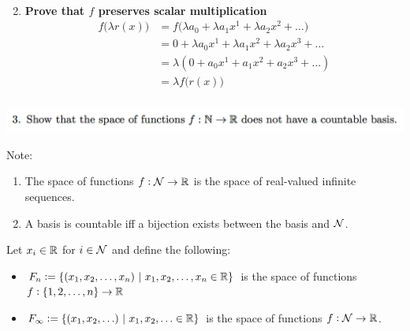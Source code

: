 \begin{enumerate}
  \begin{align*}
  \end{align*}

\item \textbf{Prove that $f$ preserves scalar multiplication}
  \begin{align*}
    f\Big(\lambda r(x)\Big)
    &= f\Big(\lambda a_0 + \lambda a_1x^1 + \lambda a_2x^2 + \ldots \Big) \\
    &= 0 + \lambda a_0x^1 + \lambda a_1x^2 + \lambda a_2x^3 + \ldots \\
    &= \lambda(0 + a_0x^1 + a_1x^2 + a_2x^3 + \ldots) \\
    &= \lambda f\Big(r(x)\Big)
  \end{align*}


\end{enumerate}

\newpage
\subsubsection{} %
\begin{mdframed}
  \includegraphics[width=400pt]{img/linear-algebra-a0-1-3.png}\\
\end{mdframed}

Note:
\begin{enumerate}
\item The space of functions $f:\mathcal{N} \to \mathbb{R}$ is the space of real-valued
  infinite sequences.
\item A basis is countable iff a bijection exists between the basis and $\mathcal{N}$.
\end{enumerate}


Let $x_i \in \mathbb{R}$ for
$i \in \mathcal{N}$ and define the following:
\begin{itemize}
\item $F_n := \{(x_1, x_2, \ldots, x_n) ~|~ x_1, x_2, \ldots, x_n \in \mathbb{R}\}$ is
  the space of functions\\$f:\{1,2, \ldots, n\} \to \mathbb{R}$
\item $F_\infty := \{(x_1, x_2, \ldots) ~|~ x_1, x_2, \ldots \in \mathbb{R}\}$ is the
  space of functions $f:\mathcal{N} \to \mathbb{R}$.
\end{itemize}

